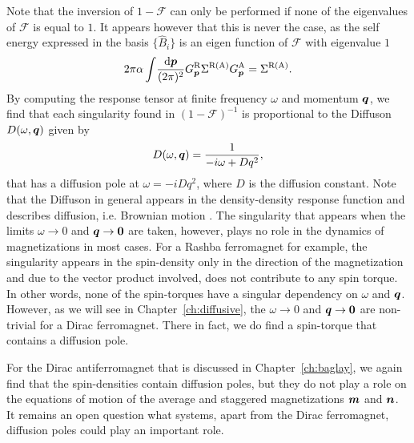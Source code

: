 Note that the inversion of $1-\mathcal{F}$ can only be performed if none of the eigenvalues of $\mathcal{F}$ is equal to $1$. It appears however that this is never the case, as the self energy expressed in the basis $\{\hat{B}_i\}$ is an eigen function of $\mathcal{F}$ with eigenvalue $1$
\begin{equation}
	2\pi\alpha\int\!\frac{\mathrm{d}\boldsymbol{p}}{(2\pi)^2} G^\text{R}_{\boldsymbol{p}}\Sigma^\text{R(A)}G^\text{A}_{\boldsymbol{p}} = \Sigma^\text{R(A)}.
\end{equation}
By computing the response tensor at finite frequency $\omega$ and momentum $\boldsymbol{q}$, we find that each singularity found in $(1-\mathcal{F})^{-1}$ is proportional to the Diffuson $D(\omega,\boldsymbol{q})$ given by
\begin{equation}
    D(\omega,\boldsymbol{q}) = \frac{1}{-i\omega+D q^2},
\end{equation}
that has a diffusion pole at $\omega = -i D q^2$, where $D$ is the diffusion constant. Note that the Diffuson in general appears in the density-density response function and describes diffusion, i.e. Brownian motion \cite{rammer_quantum_1986}. The singularity that appears when the limits $\omega\rightarrow0$ and $\boldsymbol{q}\rightarrow\boldsymbol{0}$ are taken, however, plays no role in the dynamics of magnetizations in most cases. For a Rashba ferromagnet \cite{ivan?} for example, the singularity appears in the spin-density only in the direction of the magnetization and due to the vector product involved, does not contribute to any spin torque. In other words, none of the spin-torques have a singular dependency on $\omega$ and $\boldsymbol{q}$. However, as we will see in Chapter~\ref{ch:diffusive}, the $\omega\rightarrow0$ and $\boldsymbol{q}\rightarrow\boldsymbol{0}$ are non-trivial for a Dirac ferromagnet. There in fact, we do find a spin-torque that contains a diffusion pole. 

For the Dirac antiferromagnet that is discussed in Chapter~\ref{ch:baglay}, we again find that the spin-densities contain diffusion poles, but they do not play a role on the equations of motion of the average and staggered magnetizations $\boldsymbol{m}$ and $\boldsymbol{n}$. It remains an open question what systems, apart from the Dirac ferromagnet, diffusion poles could play an important role. 
